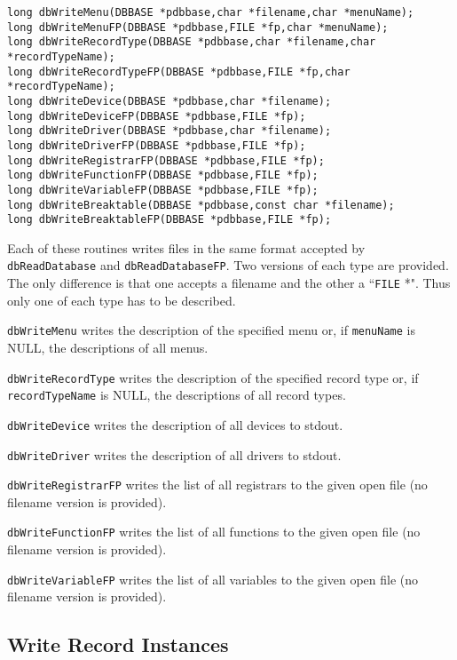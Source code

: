 \begin{verbatim}long dbWriteMenu(DBBASE *pdbbase,char *filename,char *menuName);
long dbWriteMenuFP(DBBASE *pdbbase,FILE *fp,char *menuName);
long dbWriteRecordType(DBBASE *pdbbase,char *filename,char *recordTypeName);
long dbWriteRecordTypeFP(DBBASE *pdbbase,FILE *fp,char *recordTypeName);
long dbWriteDevice(DBBASE *pdbbase,char *filename);
long dbWriteDeviceFP(DBBASE *pdbbase,FILE *fp);
long dbWriteDriver(DBBASE *pdbbase,char *filename);
long dbWriteDriverFP(DBBASE *pdbbase,FILE *fp);
long dbWriteRegistrarFP(DBBASE *pdbbase,FILE *fp);
long dbWriteFunctionFP(DBBASE *pdbbase,FILE *fp);
long dbWriteVariableFP(DBBASE *pdbbase,FILE *fp);
long dbWriteBreaktable(DBBASE *pdbbase,const char *filename);
long dbWriteBreaktableFP(DBBASE *pdbbase,FILE *fp);
\end{verbatim}
Each of these routines writes files in the same format accepted by \verb|dbReadDatabase| and \verb|dbReadDatabaseFP|. Two 
versions of each type are provided. The only difference is that one accepts a filename and the other a ``\verb|FILE| *". Thus only 
one of each type has to be described.

\verb|dbWriteMenu| writes the description of the specified menu or, if \verb|menuName| is NULL, the descriptions of all menus.

\verb|dbWriteRecordType| writes the description of the specified record type or, if \verb|recordTypeName| is NULL, the 
descriptions of all record types.

\verb|dbWriteDevice| writes the description of all devices to stdout.

\verb|dbWriteDriver| writes the description of all drivers to stdout.

\verb|dbWriteRegistrarFP| writes the list of all registrars to the given open file (no filename version is provided).

\verb|dbWriteFunctionFP| writes the list of all functions to the given open file (no filename version is provided).

\verb|dbWriteVariableFP| writes the list of all variables to the given open file (no filename version is provided).

\subsection{Write Record Instances}

